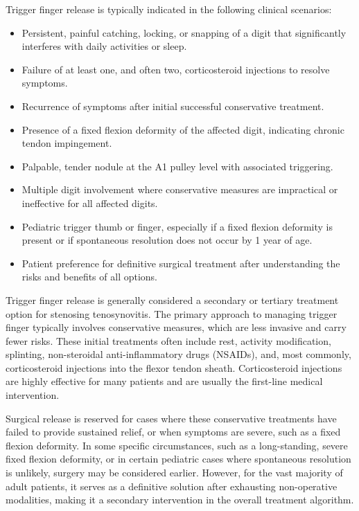Trigger finger release is typically indicated in the following clinical scenarios:
\begin{itemize}
  \item Persistent, painful catching, locking, or snapping of a digit that significantly interferes with daily activities or sleep.
  \item Failure of at least one, and often two, corticosteroid injections to resolve symptoms.
  \item Recurrence of symptoms after initial successful conservative treatment.
  \item Presence of a fixed flexion deformity of the affected digit, indicating chronic tendon impingement.
  \item Palpable, tender nodule at the A1 pulley level with associated triggering.
  \item Multiple digit involvement where conservative measures are impractical or ineffective for all affected digits.
  \item Pediatric trigger thumb or finger, especially if a fixed flexion deformity is present or if spontaneous resolution does not occur by 1 year of age.
  \item Patient preference for definitive surgical treatment after understanding the risks and benefits of all options.
\end{itemize}

Trigger finger release is generally considered a secondary or tertiary treatment option for stenosing tenosynovitis. The primary approach to managing trigger finger typically involves conservative measures, which are less invasive and carry fewer risks. These initial treatments often include rest, activity modification, splinting, non-steroidal anti-inflammatory drugs (NSAIDs), and, most commonly, corticosteroid injections into the flexor tendon sheath. Corticosteroid injections are highly effective for many patients and are usually the first-line medical intervention.

Surgical release is reserved for cases where these conservative treatments have failed to provide sustained relief, or when symptoms are severe, such as a fixed flexion deformity. In some specific circumstances, such as a long-standing, severe fixed flexion deformity, or in certain pediatric cases where spontaneous resolution is unlikely, surgery may be considered earlier. However, for the vast majority of adult patients, it serves as a definitive solution after exhausting non-operative modalities, making it a secondary intervention in the overall treatment algorithm.

